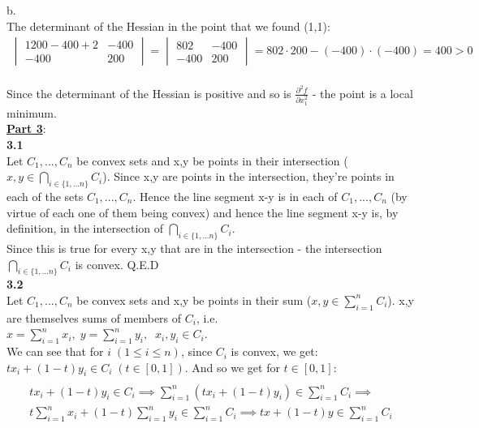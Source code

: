 \documentclass[fleqn]{article}
\begin{document}
b. \\

The determinant of the Hessian in the point that we found (1,1): \\
\begin{align*}
\begin{vmatrix} 1200-400+2 & -400 \\ -400 & 200 \end{vmatrix}
=
\begin{vmatrix} 802 & -400 \\ -400 & 200 \end{vmatrix}
=
802 \cdot 200 - (-400)\cdot(-400) = 400 >0
\end{align*} \\

Since the determinant of the Hessian is positive and so is $\frac{\partial^2 f}{\partial x_1^2}$ - the point is a local minimum. \\

\newpage\underline{\textbf{Part 3}}:\\
\textbf{3.1} \\

Let $C_1,...,C_n$ be convex sets and x,y be points in their intersection ($x,y \in \bigcap_{i \in \{1,...n\}} C_i$).
Since x,y are points in the intersection, they're points in each of the sets $C_1,...,C_n$. Hence the line segment x-y is in each of $C_1,...,C_n$ (by virtue of each one of them being convex) and hence the line segment x-y is, by definition, in the intersection of $\bigcap_{i \in \{1,...n\}} C_i$. \\
Since this is true for every x,y that are in the intersection - the intersection $\bigcap_{i \in \{1,...n\}} C_i$ is convex. Q.E.D \\

\textbf{3.2} \\

Let $C_1,...,C_n$ be convex sets and x,y be points in their sum ($x,y \in \sum_{i=1}^{n} C_i$). x,y are themselves sums of members of $C_i$, i.e. $x = \sum_{i=1}^n x_i, \; y = \sum_{i=1}^n y_i, \;\; x_i, y_i \in C_i$. \\

We can see that for $i \; (1 \leq i \leq n)$, since $C_i$ is convex, we get: $tx_i+(1-t)y_i \in C_i \; (t\in [0,1])$. And so we get for $t\in [0,1]$: \\
\begin{align*} \\
tx_i+(1-t)y_i \in C_i \implies \sum_{i=1}^n \left( tx_i+(1-t)y_i \right)
\in \sum_{i=1}^n C_i \implies \\
t \sum_{i=1}^n x_i + (1-t) \sum_{i=1}^n y_i \in \sum_{i=1}^n C_i \implies
tx + (1-t)y \in \sum_{i=1}^n C_i
\end{align*} \\
\end{document}
